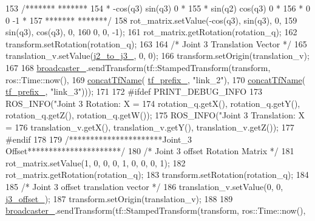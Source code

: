 \begin{DoxyCode}
{{{{{{153     \textcolor{comment}{/*******                   *******}
154 \textcolor{comment}{     * -cos(q3)     sin(q3)        0 *}
155 \textcolor{comment}{     *  sin(q2)     cos(q3)        0 *}
156 \textcolor{comment}{     *    0           0           -1 *}
157 \textcolor{comment}{     *******                  *******/}
158     rot\_matrix.setValue(-cos(q3), sin(q3), 0,
159                         sin(q3), cos(q3), 0,
160                         0, 0, -1);
161     rot\_matrix.getRotation(rotation\_q);
162     transform.setRotation(rotation\_q);
163 
164     \textcolor{comment}{/* Joint 3 Translation Vector */}
165     translation\_v.setValue(\hyperlink{classjaco_1_1JacoKinematics_ab19fccf28da90214c1aab8f11f1e7b42}{j2\_to\_j3\_}, 0, 0);
166     transform.setOrigin(translation\_v);
167 
168     \hyperlink{classjaco_1_1JacoKinematics_a3314f9e6a8fb86405384dd23bd194e46}{broadcaster\_}.sendTransform(tf::StampedTransform(transform, ros::Time::now(),
169                                                     \hyperlink{namespacejaco_a6320c11725be13d2957c4e3f474d62f8}{concatTfName}(
      \hyperlink{classjaco_1_1JacoKinematics_a0efb1f0ad1937553c7e285b27da0bdd3}{tf\_prefix\_}, \textcolor{stringliteral}{"link\_2"}),
170                                                     \hyperlink{namespacejaco_a6320c11725be13d2957c4e3f474d62f8}{concatTfName}(
      \hyperlink{classjaco_1_1JacoKinematics_a0efb1f0ad1937553c7e285b27da0bdd3}{tf\_prefix\_}, \textcolor{stringliteral}{"link\_3"})));
171 
172 \textcolor{preprocessor}{#ifdef PRINT\_DEBUG\_INFO}
173     ROS\_INFO(\textcolor{stringliteral}{"Joint 3 Rotation: X = %
174              rotation\_q.getX(), rotation\_q.getY(), rotation\_q.getZ(), rotation\_q.getW());
175     ROS\_INFO(\textcolor{stringliteral}{"Joint 3 Translation: X = %
176              translation\_v.getX(), translation\_v.getY(), translation\_v.getZ());
177 \textcolor{preprocessor}{#endif}
178 
179     \textcolor{comment}{/**********************Joint\_3 Offset**********************/}
180     \textcolor{comment}{/* Joint 3 offset Rotation Matrix */}
181     rot\_matrix.setValue(1, 0, 0, 0, 1, 0, 0, 0, 1);
182     rot\_matrix.getRotation(rotation\_q);
183     transform.setRotation(rotation\_q);
184 
185     \textcolor{comment}{/* Joint 3 offset translation vector */}
186     translation\_v.setValue(0, 0, \hyperlink{classjaco_1_1JacoKinematics_ae9e4c7a1d4e000d1697465f2f7ba4a12}{j3\_offset\_});
187     transform.setOrigin(translation\_v);
188 
189     \hyperlink{classjaco_1_1JacoKinematics_a3314f9e6a8fb86405384dd23bd194e46}{broadcaster\_}.sendTransform(tf::StampedTransform(transform, ros::Time::now(),
}}}}}}}}
\end{DoxyCode}
